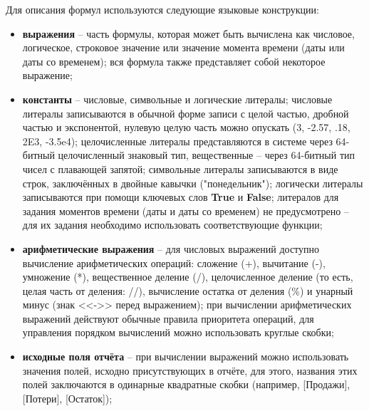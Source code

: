 \documentclass[../user-manual.tex]{subfiles}
\begin{document}
	Для описания формул используются следующие языковые конструкции:
	\begin{itemize}
		
		\item \textbf{выражения} -- часть формулы, которая может быть вычислена как числовое, логическое, строковое значение или значение момента времени (даты или даты со временем); вся формула также представляет собой некоторое выражение;
		
		\item \textbf{константы} -- числовые, символьные и логические литералы; числовые литералы записываются в обычной форме записи с целой частью, дробной частью и экспонентой, нулевую целую часть можно опускать (3, -2.57, .18, 2E3, -3.5e4); целочисленные литералы представляются в системе через 64-битный целочисленный знаковый тип, вещественные -- через 64-битный тип чисел с плавающей запятой; символьные литералы записываются в виде строк, заключённых в двойные кавычки ("понедельник"); логически литералы записываются при помощи ключевых слов \textbf{True} и \textbf{False}; литералов для задания моментов времени (даты и даты со временем) не предусмотрено -- для их задания необходимо использовать соответствующие функции;
		
		\item \textbf{арифметические выражения} -- для числовых выражений доступно вычисление арифметических операций: сложение (+), вычитание (-), умножение (*), вещественное деление (/), целочисленное деление (то есть, целая часть от деления: //), вычисление остатка от деления (\%) и унарный минус (знак <<->> перед выражением); при вычислении арифметических выражений действуют обычные правила приоритета операций, для управления порядком вычислений можно использовать круглые скобки;
		
		\item \textbf{исходные поля отчёта} -- при вычислении выражений можно использовать значения полей, исходно присутствующих в отчёте, для этого, названия этих полей заключаются в одинарные квадратные скобки (например, [Продажи], [Потери], [Остаток]);
		

\end{itemize}
\end{document}
